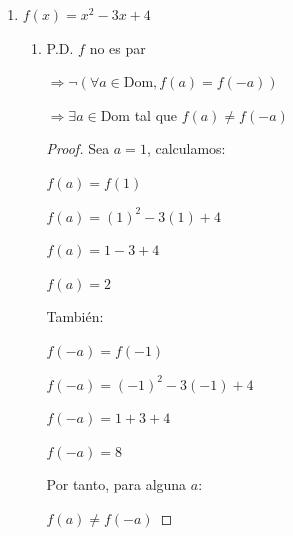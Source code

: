 \documentclass{article}
\begin{document}
\begin{enumerate}
\begin{enumerate}
\begin{enumerate}
\begin{proof}
                \(-f(-a) = -\frac{{1+a}}{{1-a}} + \frac{{1-a}}{{1+a}}\)

                \(-f(-a) = \frac{{1-a}}{{1+a}} - \frac{{1+a}}{{1-a}}\)
                \vspace{\baselineskip}
                
                Así:
                
                \(f(a) = -f(-a)\)
                \end{proof}
            \end{enumerate}
            \vspace{\baselineskip}
            
        \item[h)] \(f(x) = x^2 - 3x + 4\)
            \begin{enumerate}
                \item[1.] P.D. \( f \) no es par
                
                \(\Rightarrow \neg(\forall a \in \text{Dom}, f(a) = f(-a))\)
                
                \(\Rightarrow \exists a \in \text{Dom}\) tal que \(f(a) \neq f(-a)\)
                
                \begin{proof} Sea \(a = 1\), calculamos:
                
                \(f(a) = f(1)\)
                
                \(f(a) = (1)^2 - 3(1) + 4\)
                
                \(f(a) = 1 - 3 + 4\)
                
                \(f(a) = 2\)
                \vspace{\baselineskip}
                
                También:
                
                \(f(-a) = f(-1)\)
                
                \(f(-a) = (-1)^2 - 3(-1) + 4\)
                
                \(f(-a) = 1 + 3 + 4\)
                
                \(f(-a) = 8\)
                \vspace{\baselineskip}
                
                Por tanto, para alguna \(a\):
                
                \(f(a) \neq f(-a)\)
                \end{proof}
                

\end{enumerate}
\end{enumerate}
\end{enumerate}
\end{document}
